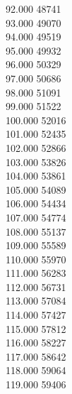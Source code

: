 { 92.000	48741 \\
 93.000	49070 \\
 94.000	49519 \\
 95.000	49932 \\
 96.000	50329 \\
 97.000	50686 \\
 98.000	51091 \\
 99.000	51522 \\
 100.000	52016 \\
 101.000	52435 \\
 102.000	52866 \\
 103.000	53826 \\
 104.000	53861 \\
 105.000	54089 \\
 106.000	54434 \\
 107.000	54774 \\
 108.000	55137 \\
 109.000	55589 \\
 110.000	55970 \\
 111.000	56283 \\
 112.000	56731 \\
 113.000	57084 \\
 114.000	57427 \\
 115.000	57812 \\
 116.000	58227 \\
 117.000	58642 \\
 118.000	59064 \\
 119.000	59406 \\
}
